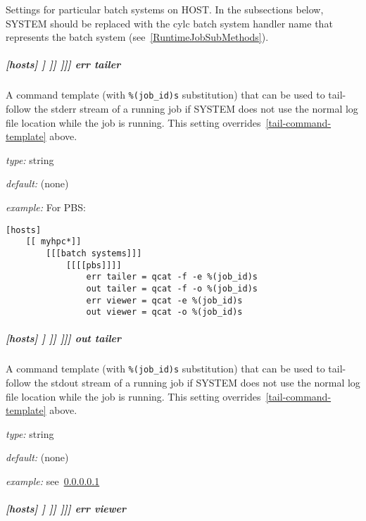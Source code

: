 Settings for particular batch systems on HOST. In the subsections below, SYSTEM
should be replaced with the cylc batch system handler name that represents the
batch system (see~\ref{RuntimeJobSubMethods}).

\subparagraph[{[[[[}SYSTEM{]]]]}err tailer]{[hosts] \textrightarrow [[HOST]] \textrightarrow [[[batch systems]]] \textrightarrow [[[[SYSTEM]]]] \textrightarrow err tailer}
\label{err-tailer}

A command template (with \lstinline=%(job_id)s= substitution) that can be used
to tail-follow the stderr stream of a running job if SYSTEM does
not use the normal log file location while the job is running.  This setting
overrides~\ref{tail-command-template} above.

\begin{myitemize}
\item {\em type:} string
\item {\em default:} (none)
\item {\em example:} For PBS:
    \begin{lstlisting}
[hosts]
    [[ myhpc*]]
        [[[batch systems]]]
            [[[[pbs]]]]
                err tailer = qcat -f -e %(job_id)s
                out tailer = qcat -f -o %(job_id)s
                err viewer = qcat -e %(job_id)s
                out viewer = qcat -o %(job_id)s
    \end{lstlisting}
\end{myitemize}

\subparagraph[{[[[[}SYSTEM{]]]]}out tailer]{[hosts] \textrightarrow [[HOST]] \textrightarrow [[[batch systems]]] \textrightarrow [[[[SYSTEM]]]] \textrightarrow out tailer}
\label{out-tailer}

A command template (with \lstinline=%(job_id)s= substitution) that can be used
to tail-follow the stdout stream of a running job if SYSTEM does
not use the normal log file location while the job is running.  This setting
overrides~\ref{tail-command-template} above.

\begin{myitemize}
\item {\em type:} string
\item {\em default:} (none)
\item {\em example:} see~\ref{err-tailer}
\end{myitemize}

\subparagraph[{[[[[}SYSTEM{]]]]}err viewer]{[hosts] \textrightarrow [[HOST]] \textrightarrow [[[batch systems]]] \textrightarrow [[[[SYSTEM]]]] \textrightarrow err viewer}

